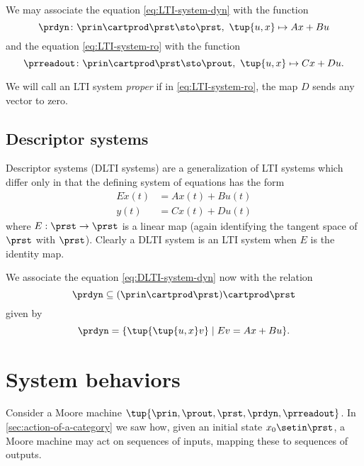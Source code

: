 We may associate the equation \cref{eq:LTI-system-dyn} with the function
\begin{equation}
    \prdyn \colon  \prin \cartprod \prst \sto \prst, \ \tup{u, x} \mapsto Ax + Bu
\end{equation}
and the equation \cref{eq:LTI-system-ro} with the function
\begin{equation}
    \prreadout \colon \prin \cartprod \prst \sto \prout, \ \tup{u,x} \mapsto Cx + Du.
\end{equation}

We will call an LTI system \emph{proper} if in \cref{eq:LTI-system-ro}, the map $D$ sends any vector to zero.

\subsection{Descriptor systems}

Descriptor systems (DLTI systems) are a generalization of LTI systems which differ only in that the defining system of equations has the form
\begin{align}
    E \dot x(t) & = Ax(t) + Bu(t) \label{eq:DLTI-system-dyn} \\
    y(t)        & = Cx(t) + Du(t) \label{eq:DLTI-system-ro}
\end{align}
where $E: \prst \to \prst$ is a linear map (again identifying the tangent space of $\prst$ with $\prst$).
Clearly a DLTI system is an LTI system when $E$ is the identity map.

We associate the equation \cref{eq:DLTI-system-dyn} now with the relation
\begin{equation}
    \prdyn \subseteq  (\prin \cartprod \prst) \cartprod \prst
\end{equation}
given by
\begin{equation}
    \prdyn = \{ \tup{ \tup{u, x} v} \mid E v = Ax + Bu \}.
\end{equation}

\section{System behaviors}


Consider a Moore machine $\tup{\prin, \prout, \prst, \prdyn, \prreadout}$.
In \cref{sec:action-of-a-category} we saw how, given an initial state $x_0 \setin \prst$, a Moore machine may act on sequences of inputs, mapping these to sequences of outputs.

